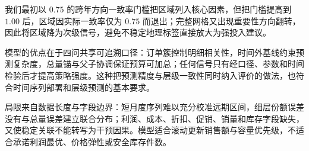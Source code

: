 我们最初以 $0.75$ 的跨年方向一致率门槛把区域列入核心因素，但把门槛提高到 $1.00$ 后，区域因实际一致率仅为 $0.75$ 而退出；完整网格又出现重要性方向翻转，因此将区域降为次级信号，避免不稳定地理标签直接放大为强投入建议。 %

模型的优点在于四问共享可追溯口径：订单簇控制明细相关性，时间外基线约束预测复杂度，总量锚与父子协调保证预算可加总；任何信号只有经口径、参数和时间检验后才提高策略强度。这种把预测精度与层级一致性同时纳入评价的做法，也符合时间序列部署和层级预测的基本要求\cite{hyndman2021forecasting,hyndman2011hierarchical}。

局限来自数据长度与字段边界：短月度序列难以充分校准远期区间，细层份额误差没有与总量误差建立联合分布；利润、成本、折扣、促销、销量和库存字段缺失，又使稳定关联不能转写为干预因果。模型适合滚动更新销售额与容量优先级，不适合承诺利润最优、价格弹性或安全库存件数。
